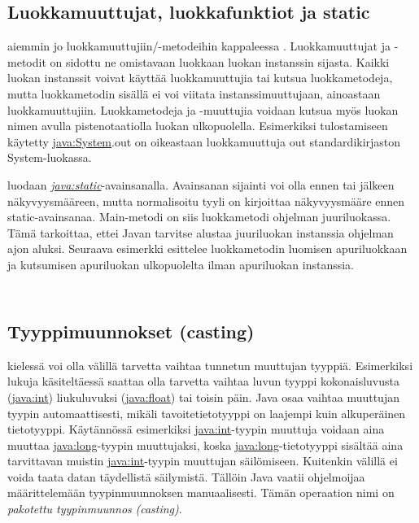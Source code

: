 \documentclass{tufte-book}
\newcommand{\eng}[1]{\textit{(#1)}}
\newcommand{\new}[1]{\textit{\gls{#1}}}
\newcommand{\neweng}[2]{\new{#1} \eng{#2}}
\newcommand{\java}[1]{\underline{\gls{java:#1}}}
\newcommand{\newjava}[1]{\textit{\java{#1}}}
\newcommand{\code}[3]{
\begin{listing}
    \inputminted{java}{OhjelmointiopasEsimerkit/src/#1/#2.java}
    \caption{#3}
    \label{Java-#1-#2}
\end{listing}
}
\begin{document}
\subsection{Luokkamuuttujat, luokkafunktiot ja static}
\label{static}

 aiemmin jo luokkamuuttujiin/-metodeihin kappaleessa
. Luokkamuuttujat ja -metodit on sidottu ne omistavaan luokkaan luokan instanssin
sijasta. Kaikki luokan instanssit voivat käyttää luokkamuuttujia tai kutsua luokkametodeja, mutta
luokkametodin sisällä ei voi viitata instanssimuuttujaan, ainoastaan luokkamuuttujiin.
Luokkametodeja ja -muuttujia voidaan kutsua myös luokan nimen avulla pistenotaatiolla luokan
ulkopuolella. Esimerkiksi tulostamiseen käytetty \java{System}.out on oikeastaan luokkamuuttuja
out standardikirjaston System-luokassa.

 luodaan \newjava{static}-avainsanalla. Avainsanan
sijainti voi olla ennen tai jälkeen näkyvyysmääreen, mutta normalisoitu tyyli on kirjoittaa
näkyvyysmääre ennen static-avainsanaa. Main-metodi on siis luokkametodi ohjelman juuriluokassa.
Tämä tarkoittaa, ettei Javan tarvitse alustaa juuriluokan instanssia ohjelman ajon aluksi.
Seuraava esimerkki esittelee luokkametodin luomisen apuriluokkaan ja kutsumisen apuriluokan
ulkopuolelta ilman apuriluokan instanssia.

\code{week3/staticexample}{StaticPrinter}{Luokkametodin luominen \java{static}-avainsanalla}
\code{week3/staticexample}{StaticExample}{Luokkametodin kutsuminen metodin määrittelevän luokan
ulkopuolella}

\subsection{Tyyppimuunnokset (casting)}
\label{casting}

 kielessä voi olla välillä tarvetta vaihtaa tunnetun
muuttujan tyyppiä. Esimerkiksi lukuja käsiteltäessä saattaa olla tarvetta vaihtaa luvun tyyppi
kokonaisluvusta (\java{int}) liukuluvuksi (\java{float}) tai toisin päin. Java osaa vaihtaa
muuttujan tyypin automaattisesti, mikäli tavoitetietotyyppi on laajempi kuin alkuperäinen
tietotyyppi. Käytännössä esimerkiksi \java{int}-tyypin muuttuja voidaan aina muuttaa
\java{long}-tyypin muuttujaksi, koska \java{long}-tietotyyppi sisältää aina tarvittavan muistin
\java{int}-tyypin muuttujan säilömiseen. Kuitenkin välillä ei voida taata datan täydellistä
säilymistä. Tällöin Java vaatii ohjelmoijaa määrittelemään tyypinmuunnoksen manuaalisesti.
Tämän operaation nimi on \neweng{pakotettu tyypinmuunnos}{casting}.
\end{document}
